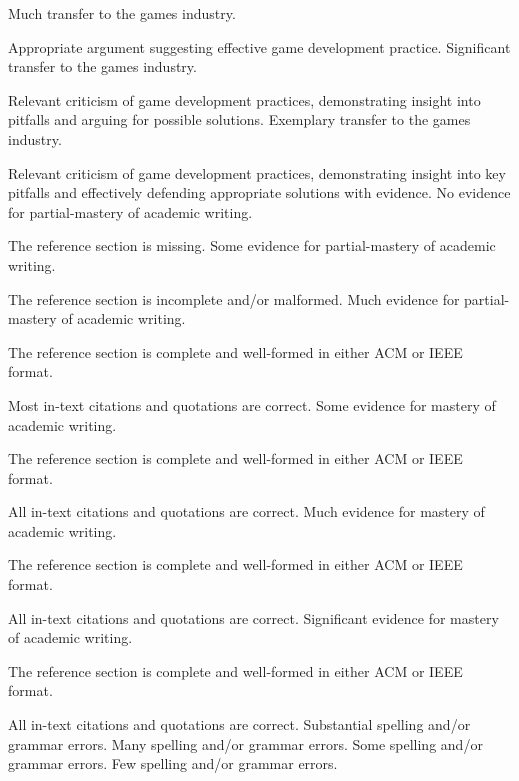 \documentclass{../fal_assignment}
\begin{document}
\begin{markingrubric}
        \grade 		Much transfer to the games industry.
        \par 		Appropriate argument suggesting effective game development practice. 
        \grade 		Significant transfer to the games industry.
        \par 		Relevant criticism of game development practices, demonstrating insight into pitfalls and arguing for possible solutions. 
        \grade 		Exemplary transfer to the games industry.
        \par 		Relevant criticism of game development practices, demonstrating insight into key pitfalls and effectively defending appropriate solutions with evidence. 
%
        \grade\fail 	No evidence for partial-mastery of academic writing.
        \par 		The reference section is missing.
        \grade 		Some evidence for partial-mastery of academic writing.
        \par 		The reference section is incomplete and/or malformed.
        \grade 		Much evidence for partial-mastery of academic writing.
        \par 		The reference section is complete and well-formed in either ACM or IEEE format.
        \par 		Most in-text citations and quotations are correct.
        \grade 		Some evidence for mastery of academic writing.
        \par 		The reference section is complete and well-formed in either ACM or IEEE format.
        \par 		All in-text citations and quotations are correct.
        \grade 		Much evidence for mastery of academic writing.
        \par 		The reference section is complete and well-formed in either ACM or IEEE format.
        \par 		All in-text citations and quotations are correct.
        \grade 		Significant evidence for mastery of academic writing.
        \par 		The reference section is complete and well-formed in either ACM or IEEE format.
        \par 		All in-text citations and quotations are correct.
%
        \grade\fail 	Substantial spelling and/or grammar errors.
        \grade 		Many spelling and/or grammar errors.
        \grade 		Some spelling and/or grammar errors.  
        \grade 		Few spelling and/or grammar errors.

\end{markingrubric}
\end{document}
